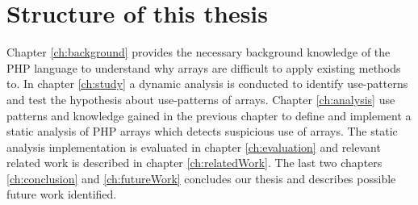 \section{Structure of this thesis}
Chapter \ref{ch:background} provides the necessary background knowledge of the PHP language to understand why arrays are difficult to apply existing methods to. In chapter \ref{ch:study} a dynamic analysis is conducted to identify use-patterns and test the hypothesis about use-patterns of arrays. Chapter \ref{ch:analysis} use patterns and knowledge gained in the previous chapter to define and implement a static analysis of PHP arrays which detects suspicious use of arrays. The static analysis implementation is evaluated in chapter \ref{ch:evaluation} and relevant related work is described in chapter \ref{ch:relatedWork}. The last two chapters \ref{ch:conclusion} and \ref{ch:futureWork} concludes our thesis and describes possible future work identified.

\begin{comment}

\section{Methodology}
To establish whether our three array types are accurate we dynamically analyse a range of popular open source PHP applications. We want to find operations that can be used to predict what type of array we are dealing with early in our static analysis.


\subsection{Metric}
\todo{In order to evaluate our results, we need to compare the performance of our tool against other similar tools wrt. the number of bugs found (real and false positives) and speed/scalability.}

\subsection{Benchmarks}

\subsection{Iterative process}

\end{comment}